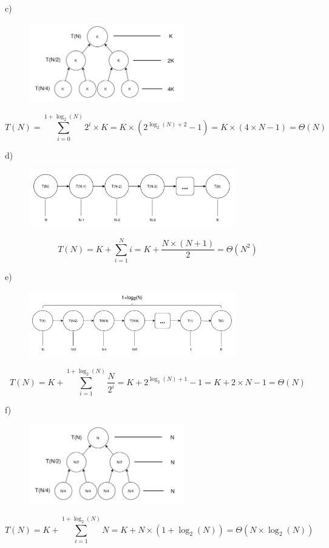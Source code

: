 \documentclass[a4paper,11pt]{article}
\begin{document}
	\newpage
	
	\noindent c)
	
	\begin{figure}[h]
		\centering
		\includegraphics[width=0.6\textwidth]{imgs/2_1-c.png}
	\end{figure}
	\[
		T(N) = \sum_{i=0}^{1 + \log_2(N)} 2^i \times K = K \times (2^{\log_2(N) + 2} - 1) = K \times (4 \times N - 1) = \Theta(N)
	\]
	
	\noindent d)
	
	\begin{figure}[h]
		\centering
		\includegraphics[width=0.8\textwidth]{imgs/2_1-d.png}
	\end{figure}
	\[
		T(N) = K + \sum_{i=1}^{N} i = K + \frac{N \times (N + 1)}{2} = \Theta(N^2)
	\]
	
	\noindent e)
	
	\begin{figure}[h]
		\centering
		\includegraphics[width=0.8\textwidth]{imgs/2_1-e.png}
	\end{figure}
	\[
		T(N) = K + \sum_{i=1}^{1 + \log_2(N)} \frac{N}{2^i} = K + 2^{\log_2(N) + 1} - 1 = K + 2 \times N - 1 = \Theta(N)
	\]
	
	\newpage
	
	\noindent f)
	
	\begin{figure}[h]
		\centering
		\includegraphics[width=0.6\textwidth]{imgs/2_1-f.png}
	\end{figure}
	\[
		T(N) = K + \sum_{i=1}^{1 + \log_2(N)} N = K + N \times (1 + \log_2(N)) = \Theta(N \times \log_2(N))
	\]
	
\end{document}
